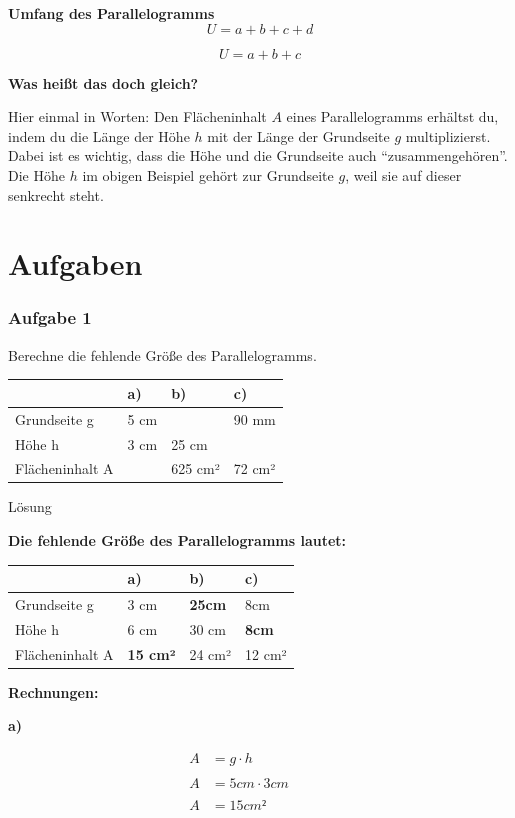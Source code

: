 \documentclass[
  ngerman,
]{book}
\begin{document}
\textbf{Umfang des Parallelogramms}
\[U = a + b + c + d\]

\[U = a + b + c\]

\textbf{Was heißt das doch gleich?}

Hier einmal in Worten: Den Flächeninhalt \(A\) eines Parallelogramms erhältst du, indem du die Länge der Höhe \(h\) mit der Länge der Grundseite \(g\) multiplizierst. Dabei ist es wichtig, dass die Höhe und die Grundseite auch ``zusammengehören''. Die Höhe \(h\) im obigen Beispiel gehört zur Grundseite \(g\), weil sie auf dieser senkrecht steht.

\hypertarget{aufgaben-2}{%
\section*{Aufgaben}\label{aufgaben-2}}

\hypertarget{aufgabe-1-2}{%
\subsubsection*{Aufgabe 1}\label{aufgabe-1-2}}

Berechne die fehlende Größe des Parallelogramms.

\begin{longtable}[]{@{}llll@{}}
\toprule
& a) & b) & c)\tabularnewline
\midrule
\endhead
Grundseite g & 5 cm & & 90 mm\tabularnewline
Höhe h & 3 cm & 25 cm &\tabularnewline
Flächeninhalt A & & 625 cm² & 72 cm²\tabularnewline
\bottomrule
\end{longtable}

Lösung

\textbf{Die fehlende Größe des Parallelogramms lautet:}

\begin{longtable}[]{@{}llll@{}}
\toprule
& a) & b) & c)\tabularnewline
\midrule
\endhead
Grundseite g & 3 cm & \textbf{25cm} & 8cm\tabularnewline
Höhe h & 6 cm & 30 cm & \textbf{8cm}\tabularnewline
Flächeninhalt A & \textbf{15 cm²} & 24 cm² & 12 cm²\tabularnewline
\bottomrule
\end{longtable}

\textbf{Rechnungen:}

\textbf{a)}

\[\begin{align} A &= g \cdot h \\
{}\\
A &= 5 cm \cdot 3 cm \quad\quad\quad \\
{}\\
A &= 15 cm² \end{align}\]
\end{document}
